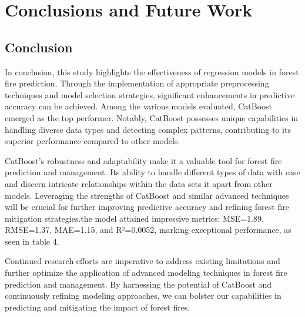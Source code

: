 \chapter{Conclusions and Future Work}
\label{ch:con}
\section{Conclusion}

In conclusion, this study highlights the effectiveness of regression models in forest fire prediction. Through the implementation of appropriate preprocessing techniques and model selection strategies, significant enhancements in predictive accuracy can be achieved. Among the various models evaluated, CatBoost emerged as the top performer. Notably, CatBoost possesses unique capabilities in handling diverse data types and detecting complex patterns, contributing to its superior performance compared to other models.

CatBoost's robustness and adaptability make it a valuable tool for forest fire prediction and management. Its ability to handle different types of data with ease and discern intricate relationships within the data sets it apart from other models. Leveraging the strengths of CatBoost and similar advanced techniques will be crucial for further improving predictive accuracy and refining forest fire mitigation strategies.the model attained impressive metrics: MSE=1.89, RMSE=1.37, MAE=1.15, and R²=0.0052, marking exceptional performance, as seen in table 4.

Continued research efforts are imperative to address existing limitations and further optimize the application of advanced modeling techniques in forest fire prediction and management. By harnessing the potential of CatBoost and continuously refining modeling approaches, we can bolster our capabilities in predicting and mitigating the impact of forest fires.
